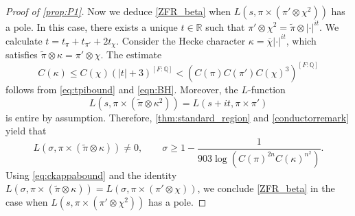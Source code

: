 \documentclass[12pt]{amsart}
\theoremstyle{definition}
\theoremstyle{remark}
\numberwithin{equation}{section}
\theoremstyle{plain}
\renewcommand{\tilde}{\widetilde}
\renewcommand{\bar}{\overline}
\newcommand{\Q}{\mathbb{Q}}
\newcommand{\R}{\mathbb{R}}
\begin{document}
\begin{proof}[Proof of \cref{prop:P1}]
Now we deduce \eqref{ZFR_beta} when $L(s,\pi\times(\pi'\otimes\chi^2))$ has a pole. In this case, there exists a unique $t\in\R$ such that $\pi'\otimes\chi^2=\tilde\pi\otimes|\cdot|^{it}$. We calculate $t=t_\pi+t_{\pi'}+2t_\chi$. Consider the Hecke character $\kappa=\bar\chi|\cdot|^{it}$, which satisfies $\tilde\pi\otimes\kappa=\pi'\otimes\chi$. The estimate
\begin{equation}\label{eq:ckappabound}
C(\kappa)\leq C(\chi)(|t|+3)^{[F:\Q]}<(C(\pi)C(\pi')C(\chi)^3)^{[F:\Q]}
\end{equation}
follows from \eqref{eq:tpibound} and \eqref{eqn:BH}.  Moreover, the $L$-function
\[L(s,\pi\times(\tilde\pi\otimes\kappa^2))=L(s+it,\pi\times\pi')\]
is entire by assumption. Therefore,  \cref{thm:standard_region} and \cref{conductorremark} yield that
\[
L(\sigma,\pi\times(\tilde\pi\otimes\kappa))\neq 0,\qquad
\sigma\geq 1-\frac{1}{903\log(C(\pi)^{2n} C(\kappa)^{n^2})}.
\]
Using \eqref{eq:ckappabound} and the identity $L(\sigma,\pi\times(\tilde\pi\otimes\kappa))=L(\sigma,\pi\times(\pi'\otimes\chi))$, we conclude \eqref{ZFR_beta} in the case when $L(s,\pi\times(\pi'\otimes\chi^2))$ has a pole.
\end{proof}
\end{document}
